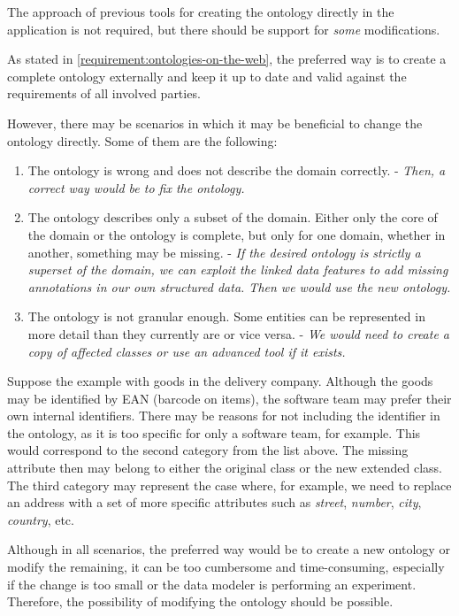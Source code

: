 \begin{requirement}
  \label{requirement:pim-editing}
  The approach of previous tools for creating the ontology directly in the application is not required, but there should be support for \textit{some} modifications.
\end{requirement}

As stated in \autoref{requirement:ontologies-on-the-web}, the preferred way is to create a complete ontology externally and keep it up to date and valid against the requirements of all involved parties.

However, there may be scenarios in which it may be beneficial to change the ontology directly. Some of them are the following:

\begin{enumerate}
  \item The ontology is wrong and does not describe the domain correctly. - \textit{Then, a correct way would be to fix the ontology.}
  \item The ontology describes only a subset of the domain. Either only the core of the domain or the ontology is complete, but only for one domain, whether in another, something may be missing. - \textit{If the desired ontology is strictly a superset of the domain, we can exploit the linked data features to add missing annotations in our own structured data. Then we would use the new ontology.}
  \item The ontology is not granular enough. Some entities can be represented in more detail than they currently are or vice versa. - \textit{We would need to create a copy of affected classes or use an advanced tool if it exists.}
\end{enumerate}

Suppose the example with goods in the delivery company. Although the goods may be identified by EAN (barcode on items), the software team may prefer their own internal identifiers. There may be reasons for not including the identifier in the ontology, as it is too specific for only a software team, for example. This would correspond to the second category from the list above. The missing attribute then may belong to either the original class or the new extended class. The third category may represent the case where, for example, we need to replace an address with a set of more specific attributes such as \textit{street}, \textit{number}, \textit{city}, \textit{country}, etc.

Although in all scenarios, the preferred way would be to create a new ontology or modify the remaining, it can be too cumbersome and time-consuming, especially if the change is too small or the data modeler is performing an experiment. Therefore, the possibility of modifying the ontology should be possible.

